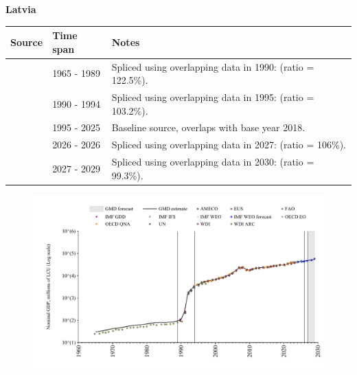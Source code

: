 \documentclass[12pt,a4paper,landscape]{article}
\begin{document}
\begin{adjustbox}{max totalsize={\paperwidth}{\paperheight},center}
\begin{minipage}[t][\textheight][t]{\textwidth}
\vspace*{0.5cm}
{}
\begin{center}
{\Large\bfseries Latvia}
\end{center}
\vspace{0.5cm}
\begin{table}[H]
\centering
\small
\begin{tabular}{|l|l|l|}
\hline
\textbf{Source} & \textbf{Time span} & \textbf{Notes} \\
\hline
\rowcolor{white}\cite{WDI_ARC}& 1965 - 1989 &Spliced using overlapping data in 1990: (ratio = 122.5\%).\\
\rowcolor{lightgray}\cite{AMECO}& 1990 - 1994 &Spliced using overlapping data in 1995: (ratio = 103.2\%).\\
\rowcolor{white}\cite{OECD_EO}& 1995 - 2025 &Baseline source, overlaps with base year 2018.\\
\rowcolor{lightgray}\cite{AMECO}& 2026 - 2026 &Spliced using overlapping data in 2027: (ratio = 106\%).\\
\rowcolor{white}\cite{IMF_WEO_forecast}& 2027 - 2029 &Spliced using overlapping data in 2030: (ratio = 99.3\%).\\
\hline
\end{tabular}
\end{table}
\begin{figure}[H]
\centering
\includegraphics[width=\textwidth,height=0.6\textheight,keepaspectratio]{graphs/LVA_nGDP.pdf}
\end{figure}
\end{minipage}
\end{adjustbox}
\end{document}
